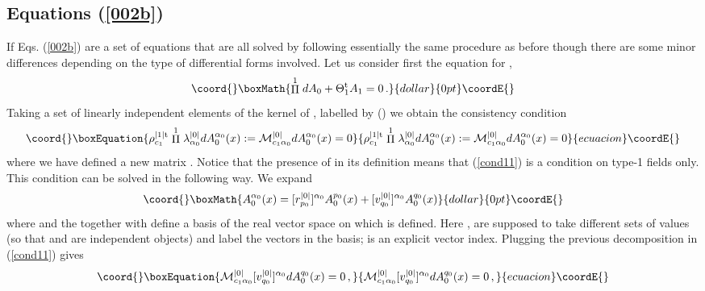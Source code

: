 \documentclass[prd,a4paper,twocolumn,amssymb,amsmath,nofootinbib,showpacs]{revtex4}
\begin{document}
\subsection{\label{Eq2} Equations (\ref{002b})}

If \coordHE{} Eqs. (\ref{002b}) are a set of \coordHE{} equations that are
all solved by following essentially the same procedure as before
though there are some minor differences depending on the type of
differential  forms involved. Let us consider first the equation
for \coordHE{},
$$\coord{}\boxMath{
\stackrel{1}{\Pi}dA_0+\Theta_{1}^{\rm{t}}A_{1}=0\,.
}{dollar}{0pt}\coordE{}$$
Taking a set of linearly independent elements of the kernel of
\coordHE{}, \coordHE{} labelled by \coordHE{}
(\coordHE{}) we obtain the consistency condition
\begin{equation}\coord{}\boxEquation{
\rho_{c_1}^{|1|\rm{t}}\stackrel{1}{\Pi}
\lambda_{\alpha_0}^{|0|}dA_0^{\alpha_0}(x):=
\mathcal{M}_{c_1\alpha_0}^{|0|}dA_0^{\alpha_0}(x)=0\label{cond11}
}{
\rho_{c_1}^{|1|\rm{t}}\stackrel{1}{\Pi}
\lambda_{\alpha_0}^{|0|}dA_0^{\alpha_0}(x):=
\mathcal{M}_{c_1\alpha_0}^{|0|}dA_0^{\alpha_0}(x)=0}{ecuacion}\coordE{}\end{equation}
where we have defined a new matrix
\coordHE{}. Notice that the presence of
\coordHE{} in its definition means that (\ref{cond11}) is
a condition on type-1 fields only. This condition can be solved in
the following way. We expand
$$\coord{}\boxMath{
A_0^{\alpha_0}(x)=[r^{|0|}_{p_0}]^{\alpha_0}A_0^{p_0}(x)+
[v^{|0|}_{q_0}]^{\alpha_0} A_0^{q_0}(x)
}{dollar}{0pt}\coordE{}$$
where
\coordHE{} and
the \coordHE{} together with
\coordHE{} define a basis of the real vector
space on which \coordHE{} is defined. Here
\coordHE{}, \coordHE{} are supposed to take different sets of values (so
that \coordHE{} and \coordHE{} are independent objects) and
label the vectors in the basis; \coordHE{} is an explicit vector
index. Plugging the previous decomposition in (\ref{cond11}) gives
\begin{equation}\coord{}\boxEquation{
\mathcal{M}_{c_1\alpha_0}^{|0|}[v^{|0|}_{q_0}]^{\alpha_0}
dA_0^{q_0}(x)=0\,,\label{ecu homo}
}{
\mathcal{M}_{c_1\alpha_0}^{|0|}[v^{|0|}_{q_0}]^{\alpha_0}
dA_0^{q_0}(x)=0\,,}{ecuacion}\coordE{}\end{equation}
\end{document}
